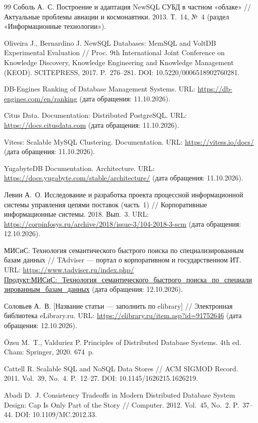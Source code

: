 \documentclass{misisarticle}
\begin{document}
\begin{thebibliography}{99}
 Соболь А.~С. Построение и адаптация NewSQL СУБД в частном «облаке» // Актуальные проблемы авиации и космонавтики. 2013. Т.~14, №~4 (раздел «Информационные технологии»).

 Oliveira J., Bernardino J. NewSQL Databases: MemSQL and VoltDB Experimental Evaluation // Proc. 9th International Joint Conference on Knowledge Discovery, Knowledge Engineering and Knowledge Management (KEOD). SCITEPRESS, 2017. P.~276--281. DOI: 10.5220/0006518902760281.

 DB-Engines Ranking of Database Management Systems. URL: \url{https://db-engines.com/en/ranking} (дата обращения: 11.10.2026).

 Citus Data. Documentation: Distributed PostgreSQL. URL: \url{https://docs.citusdata.com} (дата обращения: 11.10.2026).

 Vitess: Scalable MySQL Clustering. Documentation. URL: \url{https://vitess.io/docs/} (дата обращения: 11.10.2026).

 YugabyteDB Documentation. Architecture. URL: \url{https://docs.yugabyte.com/stable/architecture/} (дата обращения: 11.10.2026).

 Левин А.~О. Исследование и разработка проекта процессной информационной системы управления цепями поставок (часть~1) // Корпоративные информационные системы. 2018. Вып.~3. URL: \url{https://corpinfosys.ru/archive/2018/issue-3/104-2018-3-scm} (дата обращения: 12.10.2026).

 МИСиС: Технология семантического быстрого поиска по специализированным базам данных // TAdviser --- портал о корпоративном и государственном ИТ. URL: \url{https://www.tadviser.ru/index.php/Продукт:МИСиС:\_Технология\_семантического\_быстрого\_поиска\_по\_специализированным\_базам\_данных} (дата обращения: 12.10.2026).

 Соловьев А.~В. [Название статьи --- заполнить по elibrary] // Электронная библиотека eLibrary.ru. URL: \url{https://elibrary.ru/item.asp?id=91752646} (дата обращения: 12.10.2026).

 \"Ozsu M.~T., Valduriez P. Principles of Distributed Database Systems. 4th ed. Cham: Springer, 2020. 674~p.

 Cattell R. Scalable SQL and NoSQL Data Stores // ACM SIGMOD Record. 2011. Vol.~39, No.~4. P.~12--27. DOI: 10.1145/1626215.1626219.

 Abadi D.~J. Consistency Tradeoffs in Modern Distributed Database System Design: Cap Is Only Part of the Story // Computer. 2012. Vol.~45, No.~2. P.~37--44. DOI: 10.1109/MC.2012.33.


\end{thebibliography}
\end{document}
